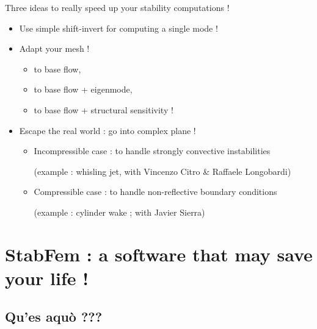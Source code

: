 \documentclass{beamer}
\begin{document}
\begin{frame}{Three ideas to really speed up your stability computations !}

\begin{itemize}[<+->]

\item Use simple shift-invert for computing a single mode !

\item Adapt your mesh !
\begin{itemize}
\item to base flow,
\item to base flow + eigenmode, 
\item to base flow + structural sensitivity !
\end{itemize}


\item Escape the real world : go into complex plane ! 

\begin{itemize}
\item Incompressible case : to handle strongly convective instabilities

(example : whisling jet, with Vincenzo Citro \& Raffaele Longobardi)

\item Compressible case : to handle non-reflective boundary conditions

(example : cylinder wake ; with Javier Sierra)
\end{itemize}


\end{itemize}

\end{frame}



\section{StabFem : a software that may save your life !}
\subsection{Qu'es aquò ???}

\end{document}
